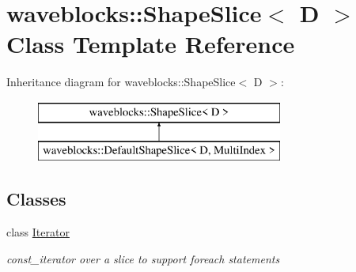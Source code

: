 \hypertarget{classwaveblocks_1_1_shape_slice}{}\section{waveblocks\+:\+:Shape\+Slice$<$ D $>$ Class Template Reference}
\label{classwaveblocks_1_1_shape_slice}
Inheritance diagram for waveblocks\+:\+:Shape\+Slice$<$ D $>$\+:\begin{figure}[H]
\begin{center}
\leavevmode
\includegraphics[height=2.000000cm]{classwaveblocks_1_1_shape_slice}
\end{center}
\end{figure}
\subsection*{Classes}
\begin{DoxyCompactItemize}
\item 
class \hyperlink{classwaveblocks_1_1_shape_slice_1_1_iterator}{Iterator}
\begin{DoxyCompactList}\small\item\em const\+\_\+iterator over a slice to support foreach statements \end{DoxyCompactList}\end{DoxyCompactItemize}
